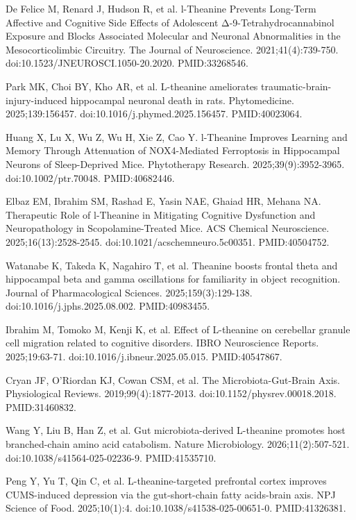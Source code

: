 \documentclass[12pt,oneside]{book}
\newcommand{\reff}[2]{\par\hangindent=7mm\hangafter=1\noindent[#1]\hspace{2mm}#2\par}
\begin{document}
\reff{10}{De Felice M, Renard J, Hudson R, et al. l-Theanine Prevents Long-Term Affective and Cognitive Side Effects of Adolescent Δ-9-Tetrahydrocannabinol Exposure and Blocks Associated Molecular and Neuronal Abnormalities in the Mesocorticolimbic Circuitry. The Journal of Neuroscience. 2021;41(4):739-750. doi:10.1523/JNEUROSCI.1050-20.2020. PMID:33268546.}

\reff{11}{Park MK, Choi BY, Kho AR, et al. L-theanine ameliorates traumatic-brain-injury-induced hippocampal neuronal death in rats. Phytomedicine. 2025;139:156457. doi:10.1016/j.phymed.2025.156457. PMID:40023064.}

\reff{12}{Huang X, Lu X, Wu Z, Wu H, Xie Z, Cao Y. l-Theanine Improves Learning and Memory Through Attenuation of NOX4-Mediated Ferroptosis in Hippocampal Neurons of Sleep-Deprived Mice. Phytotherapy Research. 2025;39(9):3952-3965. doi:10.1002/ptr.70048. PMID:40682446.}

\reff{13}{Elbaz EM, Ibrahim SM, Rashad E, Yasin NAE, Ghaiad HR, Mehana NA. Therapeutic Role of l-Theanine in Mitigating Cognitive Dysfunction and Neuropathology in Scopolamine-Treated Mice. ACS Chemical Neuroscience. 2025;16(13):2528-2545. doi:10.1021/acschemneuro.5c00351. PMID:40504752.}

\reff{14}{Watanabe K, Takeda K, Nagahiro T, et al. Theanine boosts frontal theta and hippocampal beta and gamma oscillations for familiarity in object recognition. Journal of Pharmacological Sciences. 2025;159(3):129-138. doi:10.1016/j.jphs.2025.08.002. PMID:40983455.}

\reff{15}{Ibrahim M, Tomoko M, Kenji K, et al. Effect of L-theanine on cerebellar granule cell migration related to cognitive disorders. IBRO Neuroscience Reports. 2025;19:63-71. doi:10.1016/j.ibneur.2025.05.015. PMID:40547867.}

\reff{16}{Cryan JF, O'Riordan KJ, Cowan CSM, et al. The Microbiota-Gut-Brain Axis. Physiological Reviews. 2019;99(4):1877-2013. doi:10.1152/physrev.00018.2018. PMID:31460832.}

\reff{17}{Wang Y, Liu B, Han Z, et al. Gut microbiota-derived L-theanine promotes host branched-chain amino acid catabolism. Nature Microbiology. 2026;11(2):507-521. doi:10.1038/s41564-025-02236-9. PMID:41535710.}

\reff{18}{Peng Y, Yu T, Qin C, et al. L-theanine-targeted prefrontal cortex improves CUMS-induced depression via the gut-short-chain fatty acids-brain axis. NPJ Science of Food. 2025;10(1):4. doi:10.1038/s41538-025-00651-0. PMID:41326381.}
\end{document}
